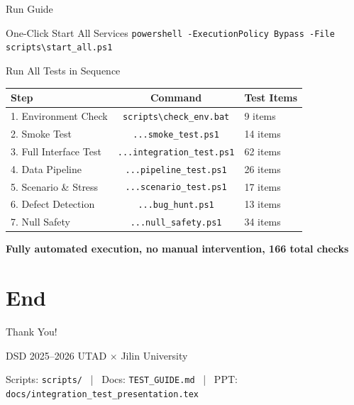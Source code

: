 \documentclass[aspectratio=169,utf8,11pt]{beamer}
\begin{document}
\begin{frame}{Run Guide}
  \begin{block}{One-Click Start All Services}
    \centering
    \texttt{powershell -ExecutionPolicy Bypass -File scripts\textbackslash start\_all.ps1}
  \end{block}

  \begin{block}{Run All Tests in Sequence}
    \centering
    \small
    \begin{tabular}{lcl}
      \toprule
      \textbf{Step} & \textbf{Command} & \textbf{Test Items} \\
      \midrule
      1. Environment Check & \texttt{scripts\textbackslash check\_env.bat} & 9 items \\
      2. Smoke Test & \texttt{...smoke\_test.ps1} & 14 items \\
      3. Full Interface Test & \texttt{...integration\_test.ps1} & 62 items \\
      4. Data Pipeline & \texttt{...pipeline\_test.ps1} & 26 items \\
      5. Scenario \& Stress & \texttt{...scenario\_test.ps1} & 17 items \\
      6. Defect Detection & \texttt{...bug\_hunt.ps1} & 13 items \\
      7. Null Safety & \texttt{...null\_safety.ps1} & 34 items \\
      \bottomrule
    \end{tabular}
  \end{block}

  \begin{center}
    \textbf{Fully automated execution, no manual intervention, 166 total checks}
  \end{center}
\end{frame}

\section*{End}

\begin{frame}[plain]
  \begin{center}
    \vspace{1.5cm}
    {\LARGE Thank You!}

    \vspace{1cm}
    {\normalsize DSD 2025--2026 \quad UTAD $\times$ Jilin University}

    \vspace{0.5cm}
    {\footnotesize Scripts: \texttt{scripts/} \ | \ Docs: \texttt{TEST\_GUIDE.md} \ | \ PPT: \texttt{docs/integration\_test\_presentation.tex}}
  \end{center}
\end{frame}
\end{document}
